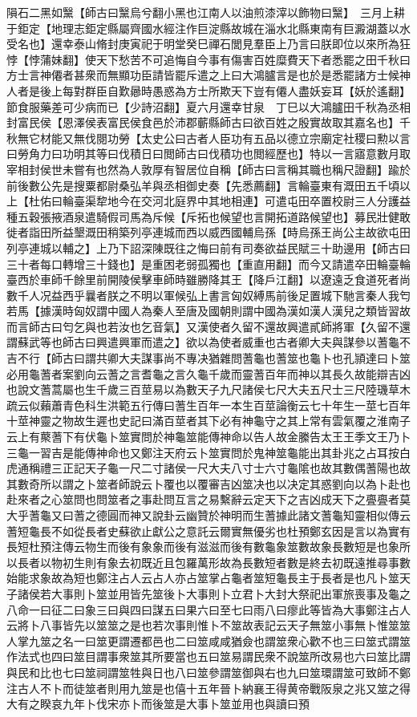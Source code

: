 隕石二黑如黳【師古曰黳烏兮翻小黑也江南人以油煎漆滓以飾物曰黳】　三月上耕于鉅定【地理志鉅定縣屬齊國水經注作巨淀縣故城在淄水北縣東南有巨澱湖蓋以水受名也】還幸泰山脩封庚寅祀于明堂癸巳禪石閭見羣臣上乃言曰朕即位以來所為狂悖【悖蒲妹翻】使天下愁苦不可追悔自今事有傷害百姓糜費天下者悉罷之田千秋曰方士言神僊者甚衆而無顯功臣請皆罷斥遣之上曰大鴻臚言是也於是悉罷諸方士候神人者是後上每對群臣自歎曏時愚惑為方士所欺天下豈有僊人盡妖妄耳【妖於遙翻】節食服藥差可少病而已【少詩沼翻】夏六月還幸甘泉　丁巳以大鴻臚田千秋為丞相封富民侯【恩澤侯表富民侯食邑於沛郡蘄縣師古曰欲百姓之殷實故取其嘉名也】千秋無它材能又無伐閱功勞【太史公曰古者人臣功有五品以德立宗廟定社稷曰勲以言曰勞角力曰功明其等曰伐積日曰閲師古曰伐積功也閲經歷也】特以一言寤意數月取宰相封侯世未嘗有也然為人敦厚有智居位自稱【師古曰言稱其職也稱尺證翻】踰於前後數公先是搜粟都尉桑弘羊與丞相御史奏【先悉薦翻】言輪臺東有溉田五千頃以上【杜佑曰輪臺渠犂地今在交河北庭界中其地相連】可遣屯田卒置校尉三人分護益種五穀張掖酒泉遣騎假司馬為斥候【斥拓也候望也言開拓道路候望也】募民壯健敢徙者詣田所益墾溉田稍築列亭連城而西以威西國輔烏孫【時烏孫王尚公主故欲屯田列亭連城以輔之】上乃下詔深陳既往之悔曰前有司奏欲益民賦三十助邊用【師古曰三十者每口轉增三十錢也】是重困老弱孤獨也【重直用翻】而今又請遣卒田輪臺輪臺西於車師千餘里前開陵侯擊車師時雖勝降其王【降戶江翻】以遼遠乏食道死者尚數千人况益西乎曩者朕之不明以軍候弘上書言匈奴縛馬前後足置城下馳言秦人我匄若馬【據漢時匈奴謂中國人為秦人至唐及國朝則謂中國為漢如漢人漢兒之類皆習故而言師古曰匄乞與也若汝也乞音氣】又漢使者久留不還故興遣貳師將軍【久留不還謂蘇武等也師古曰興遣興軍而遣之】欲以為使者威重也古者卿大夫與謀參以蓍龜不吉不行【師古曰謂共卿大夫謀事尚不專决猶雜問蓍龜也蓍筮也龜卜也孔頴達曰卜筮必用龜蓍者案劉向云蓍之言耆龜之言久龜千歲而靈蓍百年而神以其長久故能辯吉凶也說文蓍蒿屬也生千歲三百莖易以為數天子九尺諸侯七尺大夫五尺士三尺陸璣草木疏云似藾蕭青色科生洪範五行傳曰蓍生百年一本生百莖論衡云七十年生一莖七百年十莖神靈之物故生遲也史記曰滿百莖者其下必有神龜守之其上常有雲氣覆之淮南子云上有藂蓍下有伏龜卜筮實問於神龜筮能傳神命以告人故金縢告太王王季文王乃卜三龜一習吉是能傳神命也又鄭注天府云卜筮實問於鬼神筮龜能出其卦兆之占耳按白虎通稱禮三正記天子龜一尺二寸諸侯一尺大夫八寸士六寸龜隂也故其數偶蓍陽也故其數奇所以謂之卜筮者師說云卜覆也以覆審吉凶筮决也以决定其惑劉向以為卜赴也赴來者之心筮問也問筮者之事赴問互言之易繫辭云定天下之吉凶成天下之亹亹者莫大乎蓍龜又曰蓍之德圓而神又說卦云幽贊於神明而生蓍據此諸文蓍龜知靈相似傳云蓍短龜長不如從長者史蘇欲止獻公之意託云爾實無優劣也杜預鄭玄因是言以為實有長短杜預注傳云物生而後有象象而後有滋滋而後有數龜象筮數故象長數短是也象所以長者以物初生則有象去初既近且包羅萬形故為長數短者數是終去初既遠推尋事數始能求象故為短也鄭注占人云占人亦占筮掌占龜者筮短龜長主于長者是也凡卜筮天子諸侯若大事則卜筮並用皆先筮後卜大事則卜立君卜大封大祭祀出軍旅喪事及龜之八命一曰征二曰象三曰與四曰謀五曰果六曰至七曰雨八曰瘳此等皆為大事鄭注占人云將卜八事皆先以筮筮之是也若次事則惟卜不筮故表記云天子無筮小事無卜惟筮筮人掌九筮之名一曰筮更謂遷都邑也二曰筮咸咸猶僉也謂筮衆心歡不也三曰筮式謂筮作法式也四曰筮目謂事衆筮其所要當也五曰筮易謂民衆不說筮所改易也六曰筮比謂與民和比也七曰筮祠謂筮牲與日也八曰筮參謂筮御與右也九曰筮環謂筮可致師不鄭注古人不卜而徒筮者則用九筮是也僖十五年晉卜納襄王得黄帝戰阪泉之兆又筮之得大有之睽哀九年卜伐宋亦卜而後筮是大事卜筮並用也與讀曰預